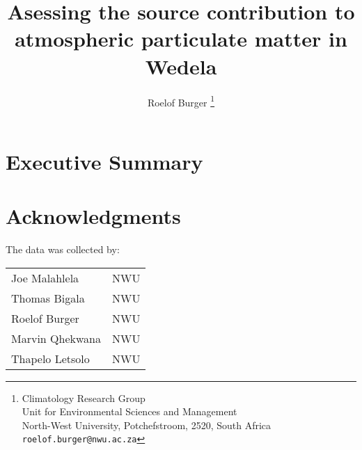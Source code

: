 \documentclass{nwureport}
\begin{document}


     \title{Asessing the source contribution to atmospheric particulate matter in Wedela}
     \author{
        Roelof Burger
          \thanks{
             Climatology Research Group\\
             Unit for Environmental Sciences and Management \\
             North-West University, Potchefstroom, 2520, South Africa \\
             {\tt roelof.burger@nwu.ac.za}} \\
     }
     \maketitle


\chapter*{Executive Summary}


\pagebreak

\chapter*{Acknowledgments}

The data was collected by:
\\
\begin{tabular}{ l l } 
Joe Malahlela  & NWU \\
Thomas Bigala  & NWU \\
Roelof Burger  & NWU \\
Marvin Qhekwana & NWU \\
Thapelo Letsolo & NWU \\
\end{tabular}

\clearpage

\dominitoc
\setcounter{tocdepth}{2} %
\pagestyle{plain}
{\thispagestyle{plain}
\tableofcontents
\clearpage
\listoffigures
{}
\clearpage
\listoftables
{}
\printglossaries
}
\end{document}

